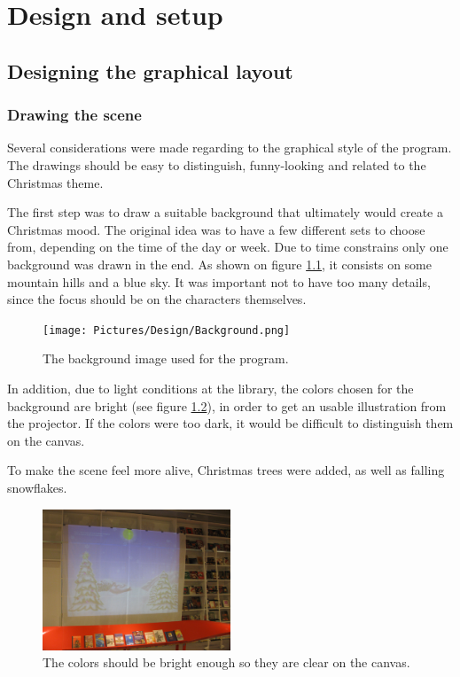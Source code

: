 \chapter{Design and setup}\label{implementation}
\section{Designing the graphical layout}
\subsection{Drawing the scene}
Several considerations were made regarding to the graphical style of the program. The drawings should be easy to distinguish, funny-looking and related to the Christmas theme. 

The first step was to draw a suitable background that ultimately would create a Christmas mood. The original idea was to have a few different sets to choose from, depending on the time of the day or week. Due to time constrains only one background was drawn in the end. As shown on figure \ref{fig:ip_Background}, it consists on some mountain hills and a blue sky. It was important not to have too many details, since the focus should be on the characters themselves.

\begin{figure}[htbp]
\centering
\texttt{[image: Pictures/Design/Background.png]}
\caption{The background image used for the program.}
\label{fig:ip_Background}
\end{figure}

In addition, due to light conditions at the library, the colors chosen for the background are bright (see figure \ref{fig:background_projector}), in order to get an usable illustration from the projector. If the colors were too dark, it would be difficult to distinguish them on the canvas.

To make the scene feel more alive, Christmas trees were added, as well as falling snowflakes.

\begin{figure}[htbp]
\centering
\includegraphics[width=0.50\textwidth]{Pictures/Design/background_projector}
\caption{The colors should be bright enough so they are clear on the canvas.}
\label{fig:background_projector}
\end{figure}

